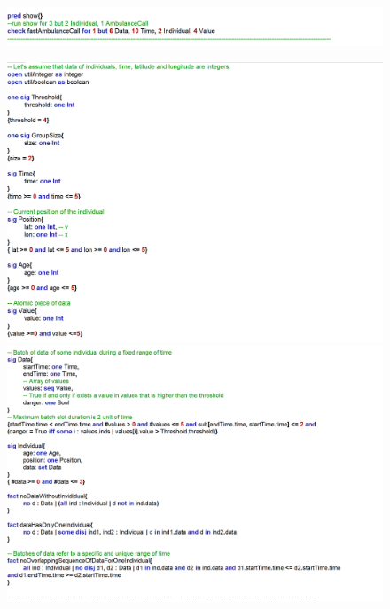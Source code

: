\documentclass{article}
\begin{document}
\begin{legal}
\begin{figure}[H]
			\includegraphics[width=\linewidth]{./images/alloy/code/automated_3.PNG}
		\end{figure}
		\begin{figure}[H]
			\newpage
			\includegraphics[width=\linewidth]{./images/alloy/code/data4Help_1.PNG}
			\includegraphics[width=\linewidth]{./images/alloy/code/data4Help_2.PNG}
		\end{figure}
		\begin{figure}[H]

\end{figure}
\end{legal}
\end{document}
